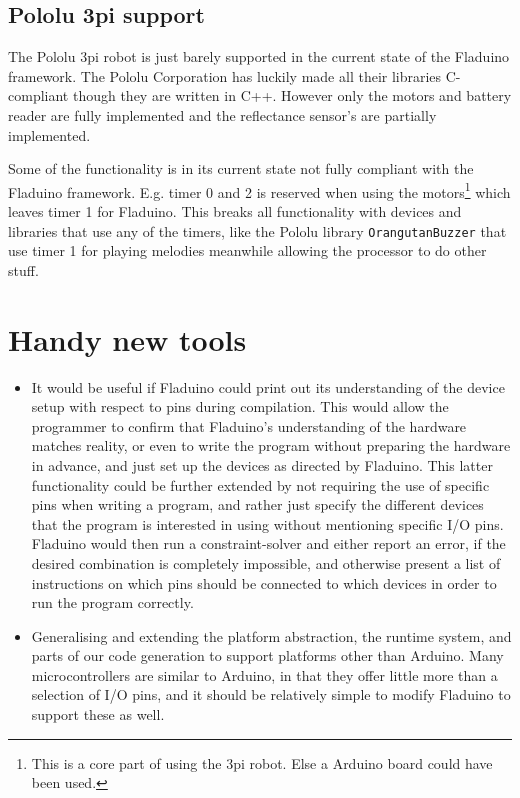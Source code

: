 \documentclass[a4paper, oneside, final]{memoir}
\begin{document}
\subsection{Pololu 3pi support}

The Pololu 3pi robot is just barely supported in the current state of
the Fladuino framework. The Pololu Corporation has luckily made all
their libraries C-compliant though they are written in C++. However
only the motors and battery reader are fully implemented and the
reflectance sensor's are partially implemented.

Some of the functionality is in its current state not fully compliant with the
Fladuino framework. E.g. timer 0 and 2 is reserved when using the
motors\footnote{This is a core part of using the 3pi robot. Else a Arduino board
  could have been used.} which leaves timer 1 for Fladuino. This breaks all
functionality with devices and libraries that use any of the timers, like the
Pololu library \texttt{OrangutanBuzzer} that use timer 1 for playing melodies
meanwhile allowing the processor to do other stuff. 


\section{Handy new tools}

\begin{itemize}
\item It would be useful if Fladuino could print out its understanding
  of the device setup with respect to pins during compilation.  This
  would allow the programmer to confirm that Fladuino's understanding
  of the hardware matches reality, or even to write the program
  without preparing the hardware in advance, and just set up the
  devices as directed by Fladuino.  This latter functionality could be
  further extended by not requiring the use of specific pins when
  writing a program, and rather just specify the different devices
  that the program is interested in using without mentioning specific
  I/O pins.  Fladuino would then run a constraint-solver and either
  report an error, if the desired combination is completely
  impossible, and otherwise present a list of instructions on which
  pins should be connected to which devices in order to run the
  program correctly.
\item Generalising and extending the platform abstraction, the runtime
  system, and parts of our code generation to support platforms other
  than Arduino.  Many microcontrollers are similar to Arduino, in that
  they offer little more than a selection of I/O pins, and it should
  be relatively simple to modify Fladuino to support these as well.
\end{itemize}
\end{document}

